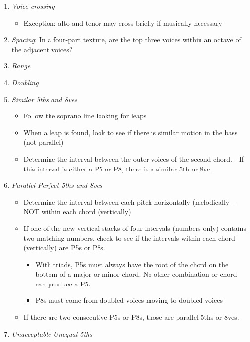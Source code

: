 \documentclass{book}
\providecommand{\tightlist}{%
  \setlength{\itemsep}{0pt}\setlength{\parskip}{0pt}}
\begin{document}
\begin{enumerate}
\def\labelenumi{\arabic{enumi}.}
\tightlist
\item
  \emph{Voice-crossing}

  \begin{itemize}
  \tightlist
  \item
    Exception: alto and tenor may cross briefly if musically necessary
  \end{itemize}
\item
  \emph{Spacing}: In a four-part texture, are the top three voices within an
  octave of the adjacent voices?
\item
  \emph{Range}
\item
  \emph{Doubling}
\item
  \emph{Similar 5ths and 8ves}

  \begin{itemize}
  \tightlist
  \item
    Follow the soprano line looking for leaps
  \item
    When a leap is found, look to see if there is similar motion in the bass
    (not parallel)
  \item
    Determine the interval between the outer voices of the second chord. - If
    this interval is either a P5 or P8, there is a similar 5th or 8ve.
  \end{itemize}
\item
  \emph{Parallel Perfect 5ths and 8ves}

  \begin{itemize}
  \tightlist
  \item
    Determine the interval between each pitch horizontally (melodically -- NOT
    within each chord (vertically)
  \item
    If one of the new vertical stacks of four intervals (numbers only)
    contains two matching numbers, check to see if the intervals within each
    chord (vertically) are P5s or P8s.

    \begin{itemize}
    \tightlist
    \item
      With triads, P5s must always have the root of the chord on the bottom of
      a major or minor chord. No other combination or chord can produce a P5.
    \item
      P8s must come from doubled voices moving to doubled voices
    \end{itemize}
  \item
    If there are two consecutive P5s or P8s, those are parallel 5ths or 8ves.
  \end{itemize}
\item
  \emph{Unacceptable Unequal 5ths}


\end{enumerate}
\end{document}
